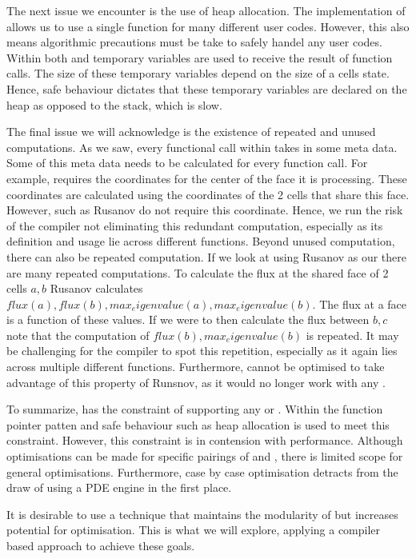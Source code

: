 The next issue we encounter is the use of heap allocation.
The implementation of  allows us to use a single function for many different user codes.
However, this also means algorithmic precautions must be take to safely handel any user codes.
Within both  and  temporary variables are used to receive the result of function calls.
The size of these temporary variables depend on the size of a cells state.
Hence, safe behaviour dictates that these temporary variables are declared on the heap as opposed to the stack, which is slow. 





The final issue we will acknowledge is the existence of repeated and unused computations.
As we saw, every functional call within  takes in some meta data.
Some of this meta data needs to be calculated for every function call.
For example,  requires the coordinates for the center of the face it is processing.
These coordinates are calculated using the coordinates of the 2 cells that share this face.
However,  such as Rusanov do not require this coordinate.
Hence, we run the risk of the compiler not eliminating this redundant computation, especially as its definition and usage lie across different functions. 
Beyond unused computation, there can also be repeated computation.
If we look at using Rusanov as our  there are many repeated computations.
To calculate the flux at the shared face of 2 cells $a,b$ Rusanov calculates $flux(a), flux(b), max_eigenvalue(a), max_eigenvalue(b)$.
The flux at a face is a function of these values.
If we were to then calculate the flux between $b,c$ note that the computation of $flux(b), max_eigenvalue(b)$ is repeated.
It may be challenging for the compiler to spot this repetition, especially as it again lies across multiple different functions.
Furthermore,  cannot be optimised to take advantage of this property of Runsnov, as it would no longer work with any .

To summarize,  has the constraint of supporting any  or . 
Within  the function pointer patten and safe behaviour such as heap allocation is used to meet this constraint.
However, this constraint is in contension with performance.
Although optimisations can be made for specific pairings of  and , there is limited scope for general optimisations. 
Furthermore, case by case optimisation detracts from the draw of using a PDE engine in the first place.

It is desirable to use a technique that maintains the modularity of  but increases potential for optimisation.
This is what we will explore, applying a compiler based approach to achieve these goals.

